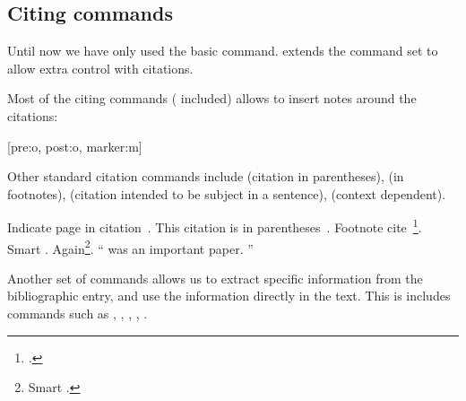 \begin{example}[standalone,
  biber,
  paperwidth=7cm,
  paperheight=3cm,
]
\usepackage[
  maxnames=4,
]{biblatex}

\sloppy

\nocite{lshort}
\printbibliography[heading=none]


\end{example}

\begin{example}[standalone,
  biber,
  paperwidth=7cm,
  paperheight=3cm,
]
\usepackage[
  minnames=2,
]{biblatex}

\sloppy

\nocite{lshort}
\printbibliography[heading=none]


\end{example}

\subsection{Citing commands}

Until now we have only used the basic  command.  extends
the command set to allow extra control with
citations.

Most of the citing commands ( included) allows to insert notes
around the citations:
\begin{lscommand}
  [pre:o, post:o, marker:m]
\end{lscommand}
Other standard citation commands include  (citation in
parentheses),  (in footnotes),  (citation intended to
be subject in a sentence),  (context dependent).

\begin{example}[standalone,
  biber,
  paperwidth=5cm,
  paperheight=5cm,
]
\usepackage[style=alphabetic]{biblatex}
\usepackage{csquotes}

\sloppy

Indicate page in
citation~\cite[25]{lshort}. 
This citation is in
parentheses~\parencite{curie}.
Footnote cite~\footcite{dream}.
Smart \smartcite[See][78]{lshort}.
Again\footnote{Smart
\smartcite[12--56]{dream}.}.
\enquote{\Textcite{curie}
  was an important paper.
}

\end{example}

Another set of commands allows us to extract specific information from
the bibliographic entry, and use the information directly in the text. This is includes commands such as ,
, , , .


